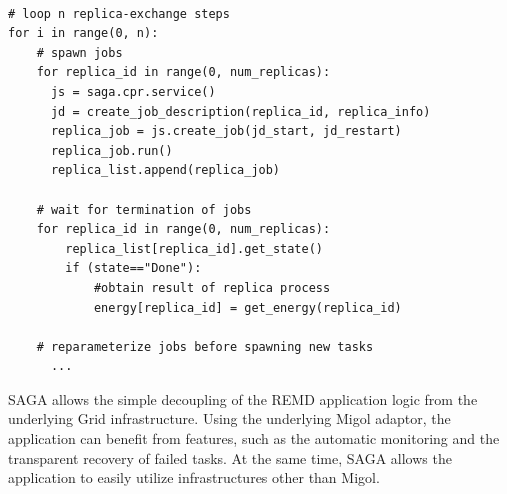 \documentclass[times, 10pt, twocolumn]{article}
\newcommand{\jhanote}[1]{ {\textcolor{red} { ***SJ: #1 }}}
\newcommand{\jhanote}[1]{}
\begin{document}
                                             
\begin{lstlisting}[style=myPythonListing, float=t, caption={\small \bf REMD-Manager: Replica Orchestration}, 
label={lst:python_saga_chkpt_reg}]

# loop n replica-exchange steps  
for i in range(0, n):     
    # spawn jobs
    for replica_id in range(0, num_replicas):
      js = saga.cpr.service()
      jd = create_job_description(replica_id, replica_info)    
      replica_job = js.create_job(jd_start, jd_restart)
      replica_job.run()
      replica_list.append(replica_job)
     
    # wait for termination of jobs
    for replica_id in range(0, num_replicas):     
        replica_list[replica_id].get_state()
        if (state=="Done"):                          
            #obtain result of replica process
            energy[replica_id] = get_energy(replica_id)
 
    # reparameterize jobs before spawning new tasks      
      ...                    
\end{lstlisting}     

SAGA allows the simple decoupling of the REMD application logic from the underlying Grid infrastructure. 
Using the underlying Migol adaptor, the application can benefit from features, such as the  automatic monitoring
and the transparent recovery of failed tasks. At the same time, SAGA allows the application to easily utilize 
infrastructures other than Migol.


\end{document}

